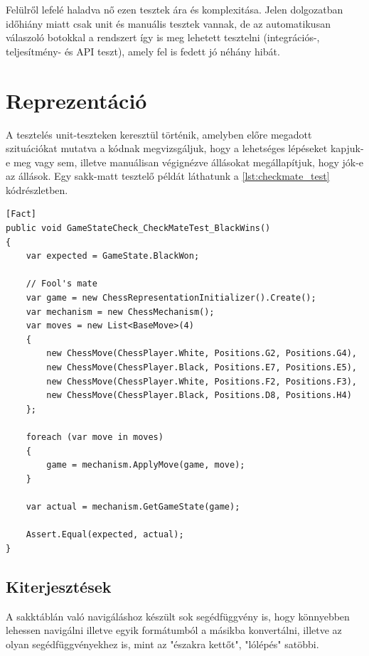 \documentclass[twoside, a4paper, 12pt]{book}
\begin{document}
Felülről lefelé haladva nő ezen tesztek ára és komplexitása. Jelen dolgozatban időhiány miatt csak unit és manuális tesztek vannak, de az automatikusan válaszoló botokkal a rendszert így is meg lehetett tesztelni (integrációs-, teljesítmény- és API teszt), amely fel is fedett jó néhány hibát.

\section{Reprezentáció}
A tesztelés unit-teszteken keresztül történik, amelyben előre megadott szituációkat mutatva a kódnak megvizsgáljuk, hogy a lehetséges lépéseket kapjuk-e meg vagy sem, illetve manuálisan végignézve állásokat megállapítjuk, hogy jók-e az állások. Egy sakk-matt tesztelő példát láthatunk a \ref{lst:checkmate_test} kódrészletben.

\begin{lstlisting}[caption=Sakk-matt detektálás teszt, label=lst:checkmate_test, float]
[Fact]
public void GameStateCheck_CheckMateTest_BlackWins()
{
	var expected = GameState.BlackWon;
	
	// Fool's mate
	var game = new ChessRepresentationInitializer().Create();
	var mechanism = new ChessMechanism();
	var moves = new List<BaseMove>(4)
	{
		new ChessMove(ChessPlayer.White, Positions.G2, Positions.G4),
		new ChessMove(ChessPlayer.Black, Positions.E7, Positions.E5),
		new ChessMove(ChessPlayer.White, Positions.F2, Positions.F3),
		new ChessMove(ChessPlayer.Black, Positions.D8, Positions.H4)
	};
	
	foreach (var move in moves)
	{
		game = mechanism.ApplyMove(game, move);
	}
	
	var actual = mechanism.GetGameState(game);
	
	Assert.Equal(expected, actual);
}
\end{lstlisting}
\subsection{Kiterjesztések}
A sakktáblán való navigáláshoz készült sok segédfüggvény is, hogy könnyebben lehessen navigálni illetve egyik formátumból a másikba konvertálni, illetve az olyan segédfüggvényekhez is, mint az "északra kettőt", "lólépés" satöbbi.
\end{document}

